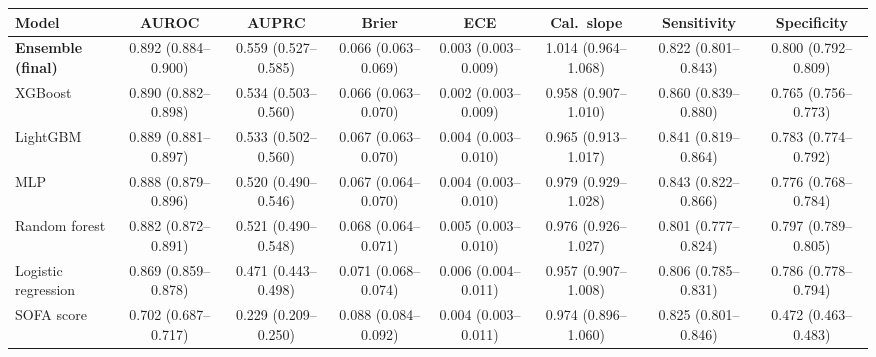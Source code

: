 \begin{tabular}{@{}lccccccc@{}}
\toprule
Model & AUROC & AUPRC & Brier & ECE & Cal.\ slope & Sensitivity & Specificity \\
\midrule
\textbf{Ensemble (final)} & 0.892 (0.884--0.900) & 0.559 (0.527--0.585) & 0.066 (0.063--0.069) & 0.003 (0.003--0.009) & 1.014 (0.964--1.068) & 0.822 (0.801--0.843) & 0.800 (0.792--0.809) \\
XGBoost & 0.890 (0.882--0.898) & 0.534 (0.503--0.560) & 0.066 (0.063--0.070) & 0.002 (0.003--0.009) & 0.958 (0.907--1.010) & 0.860 (0.839--0.880) & 0.765 (0.756--0.773) \\
LightGBM & 0.889 (0.881--0.897) & 0.533 (0.502--0.560) & 0.067 (0.063--0.070) & 0.004 (0.003--0.010) & 0.965 (0.913--1.017) & 0.841 (0.819--0.864) & 0.783 (0.774--0.792) \\
MLP & 0.888 (0.879--0.896) & 0.520 (0.490--0.546) & 0.067 (0.064--0.070) & 0.004 (0.003--0.010) & 0.979 (0.929--1.028) & 0.843 (0.822--0.866) & 0.776 (0.768--0.784) \\
Random forest & 0.882 (0.872--0.891) & 0.521 (0.490--0.548) & 0.068 (0.064--0.071) & 0.005 (0.003--0.010) & 0.976 (0.926--1.027) & 0.801 (0.777--0.824) & 0.797 (0.789--0.805) \\
Logistic regression & 0.869 (0.859--0.878) & 0.471 (0.443--0.498) & 0.071 (0.068--0.074) & 0.006 (0.004--0.011) & 0.957 (0.907--1.008) & 0.806 (0.785--0.831) & 0.786 (0.778--0.794) \\
SOFA score & 0.702 (0.687--0.717) & 0.229 (0.209--0.250) & 0.088 (0.084--0.092) & 0.004 (0.003--0.011) & 0.974 (0.896--1.060) & 0.825 (0.801--0.846) & 0.472 (0.463--0.483) \\
\bottomrule
\end{tabular}
